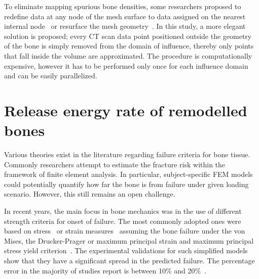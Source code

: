 \documentclass[11pt]{acmeArticle}
\numberwithin{equation}{section}
\begin{document}
To eliminate mapping spurious bone densities, some researchers proposed to redefine data at any node of the mesh surface to data assigned on the nearest internal node~\citep{helgason2008modified, chen2010new} or resurface the mesh geometry~\citep{peleg2014can}. 
In this study, a more elegant solution is proposed; every CT scan data point positioned outside the geometry of the bone is simply removed from the domain of influence, thereby only points that fall inside the volume are approximated. 
The procedure is computationally expensive, however it has to be performed only once for each influence domain and can be easily parallelized. %
\section{Release energy rate of remodelled bones}\label{sec:release_energy}
Various theories exist in the literature regarding failure criteria for bone tissue. Commonly researchers attempt to estimate the fracture risk within the framework of finite element analysis. In particular, subject-specific FEM models could potentially quantify how far the bone is from failure under given loading scenario. However, this still remains an open challenge.

In recent years, the main focus in bone mechanics was in the use of different strength criteria for onset of failure. 
The most commonly adopted ones were based on stress~\citep{keyak2005predicting} or strain measures~\citep{schileo2008subject} assuming the bone failure under the von Mises, the Drucker-Prager or maximum principal strain and maximum principal stress yield criterion~\citep{yosibash2010predicting}. 
The experimental validations for such simplified models show that they have a significant spread in the predicted failure. 
The percentage error in the majority of studies report is between 10\% and 20\%~\citep{van2014accurately}.
\end{document}
